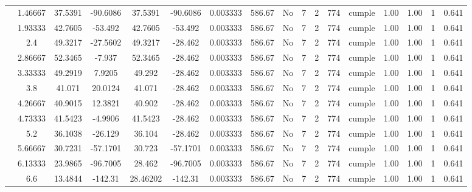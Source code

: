 \begin{table}[H]
{\begin{tabular}{|c|c|c|c|c|c|c|c|c|c|c|c|c|c|c|c|c|}
\cline{2-17}    & 1.46667 & 37.5391 & -90.6086 & 37.5391 & -90.6086 & 0.003333 & 586.67 & No  & 7   & 2   & 774 & \cellcolor[rgb]{ .776,  .937,  .808}cumple & 1.00 & 1.00 & 1   & 0.641 \bigstrut\\
\cline{2-17}    & 1.93333 & 42.7605 & -53.492 & 42.7605 & -53.492 & 0.003333 & 586.67 & No  & 7   & 2   & 774 & \cellcolor[rgb]{ .776,  .937,  .808}cumple & 1.00 & 1.00 & 1   & 0.641 \bigstrut\\
\cline{2-17}    & 2.4 & 49.3217 & -27.5602 & 49.3217 & -28.462 & 0.003333 & 586.67 & No  & 7   & 2   & 774 & \cellcolor[rgb]{ .776,  .937,  .808}cumple & 1.00 & 1.00 & 1   & 0.641 \bigstrut\\
\cline{2-17}    & 2.86667 & 52.3465 & -7.937 & 52.3465 & -28.462 & 0.003333 & 586.67 & No  & 7   & 2   & 774 & \cellcolor[rgb]{ .776,  .937,  .808}cumple & 1.00 & 1.00 & 1   & 0.641 \bigstrut\\
\cline{2-17}    & 3.33333 & 49.2919 & 7.9205 & 49.292 & -28.462 & 0.003333 & 586.67 & No  & 7   & 2   & 774 & \cellcolor[rgb]{ .776,  .937,  .808}cumple & 1.00 & 1.00 & 1   & 0.641 \bigstrut\\
\cline{2-17}    & 3.8 & 41.071 & 20.0124 & 41.071 & -28.462 & 0.003333 & 586.67 & No  & 7   & 2   & 774 & \cellcolor[rgb]{ .776,  .937,  .808}cumple & 1.00 & 1.00 & 1   & 0.641 \bigstrut\\
\cline{2-17}    & 4.26667 & 40.9015 & 12.3821 & 40.902 & -28.462 & 0.003333 & 586.67 & No  & 7   & 2   & 774 & \cellcolor[rgb]{ .776,  .937,  .808}cumple & 1.00 & 1.00 & 1   & 0.641 \bigstrut\\
\cline{2-17}    & 4.73333 & 41.5423 & -4.9906 & 41.5423 & -28.462 & 0.003333 & 586.67 & No  & 7   & 2   & 774 & \cellcolor[rgb]{ .776,  .937,  .808}cumple & 1.00 & 1.00 & 1   & 0.641 \bigstrut\\
\cline{2-17}    & 5.2 & 36.1038 & -26.129 & 36.104 & -28.462 & 0.003333 & 586.67 & No  & 7   & 2   & 774 & \cellcolor[rgb]{ .776,  .937,  .808}cumple & 1.00 & 1.00 & 1   & 0.641 \bigstrut\\
\cline{2-17}    & 5.66667 & 30.7231 & -57.1701 & 30.723 & -57.1701 & 0.003333 & 586.67 & No  & 7   & 2   & 774 & \cellcolor[rgb]{ .776,  .937,  .808}cumple & 1.00 & 1.00 & 1   & 0.641 \bigstrut\\
\cline{2-17}    & 6.13333 & 23.9865 & -96.7005 & 28.462 & -96.7005 & 0.003333 & 586.67 & No  & 7   & 2   & 774 & \cellcolor[rgb]{ .776,  .937,  .808}cumple & 1.00 & 1.00 & 1   & 0.641 \bigstrut\\
\cline{2-17}    & \cellcolor[rgb]{ .851,  .882,  .949}6.6 & 13.4844 & -142.31 & 28.46202 & -142.31 & 0.003333 & 586.67 & No  & 7   & 2   & 774 & \cellcolor[rgb]{ .776,  .937,  .808}cumple & 1.00 & 1.00 & 1   & 0.641 \bigstrut\\

\end{tabular}}
\end{table}
